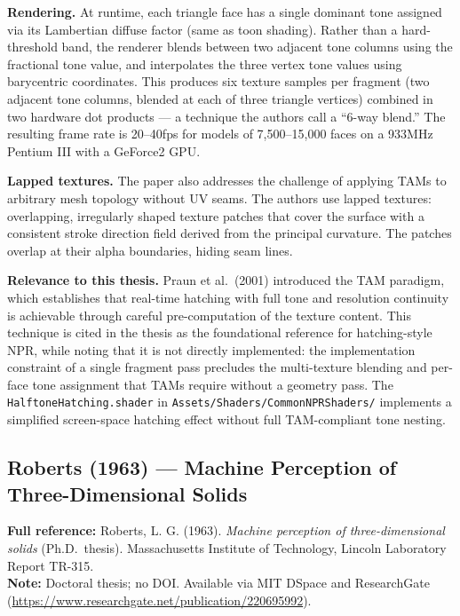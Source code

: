 \documentclass[11pt, a4paper]{article}
\begin{document}
\textbf{Rendering.} At runtime, each triangle face has a single dominant tone assigned via its Lambertian diffuse factor (same as toon shading). Rather than a hard-threshold band, the renderer blends between two adjacent tone columns using the fractional tone value, and interpolates the three vertex tone values using barycentric coordinates. This produces six texture samples per fragment (two adjacent tone columns, blended at each of three triangle vertices) combined in two hardware dot products --- a technique the authors call a ``6-way blend.'' The resulting frame rate is 20--40fps for models of 7,500--15,000 faces on a 933MHz Pentium III with a GeForce2 GPU.

\textbf{Lapped textures.} The paper also addresses the challenge of applying TAMs to arbitrary mesh topology without UV seams. The authors use lapped textures: overlapping, irregularly shaped texture patches that cover the surface with a consistent stroke direction field derived from the principal curvature. The patches overlap at their alpha boundaries, hiding seam lines.

\textbf{Relevance to this thesis.} Praun et al.\ (2001) introduced the TAM paradigm, which establishes that real-time hatching with full tone and resolution continuity is achievable through careful pre-computation of the texture content. This technique is cited in the thesis as the foundational reference for hatching-style NPR, while noting that it is not directly implemented: the implementation constraint of a single fragment pass precludes the multi-texture blending and per-face tone assignment that TAMs require without a geometry pass. The \texttt{HalftoneHatching.shader} in \texttt{Assets/Shaders/CommonNPRShaders/} implements a simplified screen-space hatching effect without full TAM-compliant tone nesting.

\vspace{8pt}
\subsection{Roberts (1963) --- Machine Perception of Three-Dimensional Solids}

\begin{refbox}
\textbf{Full reference:} Roberts, L. G. (1963). \textit{Machine perception of three-dimensional solids} (Ph.D.\ thesis). Massachusetts Institute of Technology, Lincoln Laboratory Report TR-315.\\[4pt]
\textbf{Note:} Doctoral thesis; no DOI. Available via MIT DSpace and ResearchGate (\url{https://www.researchgate.net/publication/220695992}).
\end{refbox}
\end{document}
